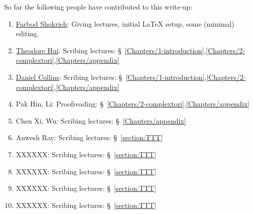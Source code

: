 



\vspace{+.5cm}

So far the following people have contributed to this write-up:
\begin{enumerate}
\item \href{http://www.math.cornell.edu/~farbod}{Farbod Shokrieh}: Giving lectures, initial LaTeX setup, some (minimal) editing.
\item \href{http://www.math.cornell.edu/m/People/bynetid/hh535}{Theodore Hui}: Scribing lectures: \S~\ref{Chapters/1-introduction},\ref{Chapters/2-complextori},\ref{Chapters/appendix}
\item \href{https://www.math.cornell.edu/m/People/bynetid/djc224}{Daniel Collins}: Scribing lectures: \S~\ref{Chapters/1-introduction},\ref{Chapters/2-complextori},\ref{Chapters/appendix}
\item Pak Hin, Li: Proofreading: \S~\ref{Chapters/2-complextori},\ref{Chapters/appendix}
\item Chen Xi, Wu: Scribing lectures: \S~\ref{Chapters/appendix}
\item Anwesh Ray: Scribing lectures: \S~\ref{section:TTT}
\item XXXXXX: Scribing lectures: \S~\ref{section:TTT}
\item XXXXXX: Scribing lectures: \S~\ref{section:TTT}
\item XXXXXX: Scribing lectures: \S~\ref{section:TTT}
\item XXXXXX: Scribing lectures: \S~\ref{section:TTT}
\end{enumerate}



